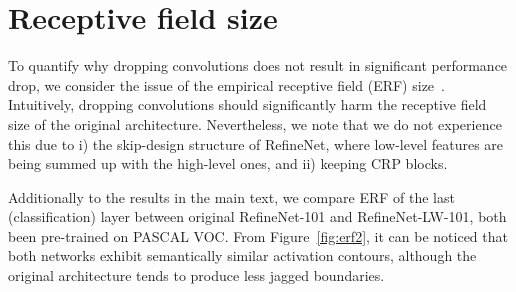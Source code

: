 \documentclass{bmvc2k}
\begin{document}
					\section{Receptive field size}
					\label{ss:erf}
					To quantify why dropping  convolutions does not result in significant performance drop, we consider the issue of the empirical receptive field (ERF) size~\cite{ZhouKLOT14}. Intuitively, dropping  convolutions should significantly harm the receptive field size of the original architecture. Nevertheless, we note that we do not experience this due to i) the skip-design structure of RefineNet, where low-level features are being summed up with the high-level ones, and ii) keeping CRP blocks.
					
					
					Additionally to the results in the main text, we compare ERF of the last (classification) layer between original RefineNet-101 and RefineNet-LW-101, both been pre-trained on PASCAL VOC. From Figure~\ref{fig:erf2}, it can be noticed that both networks exhibit semantically similar activation contours, although the original architecture tends to produce less jagged boundaries.
\end{document}
